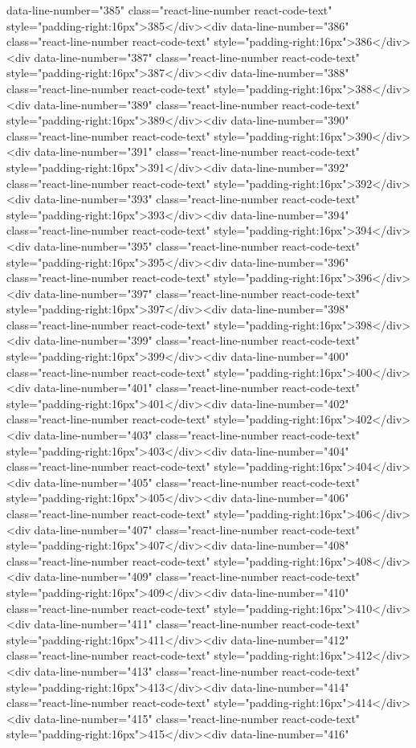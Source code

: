 {{{{{{{data-line-number="385" class="react-line-number react-code-text" style="padding-right:16px">385</div><div data-line-number="386" class="react-line-number react-code-text" style="padding-right:16px">386</div><div data-line-number="387" class="react-line-number react-code-text" style="padding-right:16px">387</div><div data-line-number="388" class="react-line-number react-code-text" style="padding-right:16px">388</div><div data-line-number="389" class="react-line-number react-code-text" style="padding-right:16px">389</div><div data-line-number="390" class="react-line-number react-code-text" style="padding-right:16px">390</div><div data-line-number="391" class="react-line-number react-code-text" style="padding-right:16px">391</div><div data-line-number="392" class="react-line-number react-code-text" style="padding-right:16px">392</div><div data-line-number="393" class="react-line-number react-code-text" style="padding-right:16px">393</div><div data-line-number="394" class="react-line-number react-code-text" style="padding-right:16px">394</div><div data-line-number="395" class="react-line-number react-code-text" style="padding-right:16px">395</div><div data-line-number="396" class="react-line-number react-code-text" style="padding-right:16px">396</div><div data-line-number="397" class="react-line-number react-code-text" style="padding-right:16px">397</div><div data-line-number="398" class="react-line-number react-code-text" style="padding-right:16px">398</div><div data-line-number="399" class="react-line-number react-code-text" style="padding-right:16px">399</div><div data-line-number="400" class="react-line-number react-code-text" style="padding-right:16px">400</div><div data-line-number="401" class="react-line-number react-code-text" style="padding-right:16px">401</div><div data-line-number="402" class="react-line-number react-code-text" style="padding-right:16px">402</div><div data-line-number="403" class="react-line-number react-code-text" style="padding-right:16px">403</div><div data-line-number="404" class="react-line-number react-code-text" style="padding-right:16px">404</div><div data-line-number="405" class="react-line-number react-code-text" style="padding-right:16px">405</div><div data-line-number="406" class="react-line-number react-code-text" style="padding-right:16px">406</div><div data-line-number="407" class="react-line-number react-code-text" style="padding-right:16px">407</div><div data-line-number="408" class="react-line-number react-code-text" style="padding-right:16px">408</div><div data-line-number="409" class="react-line-number react-code-text" style="padding-right:16px">409</div><div data-line-number="410" class="react-line-number react-code-text" style="padding-right:16px">410</div><div data-line-number="411" class="react-line-number react-code-text" style="padding-right:16px">411</div><div data-line-number="412" class="react-line-number react-code-text" style="padding-right:16px">412</div><div data-line-number="413" class="react-line-number react-code-text" style="padding-right:16px">413</div><div data-line-number="414" class="react-line-number react-code-text" style="padding-right:16px">414</div><div data-line-number="415" class="react-line-number react-code-text" style="padding-right:16px">415</div><div data-line-number="416" }}}}}}}
